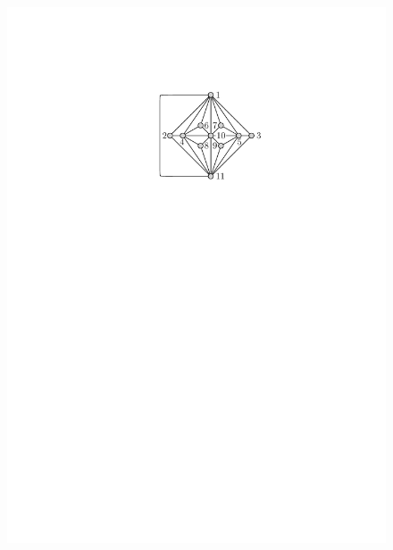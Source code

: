 \documentclass[runningheads]{llncs}
\begin{document}
\begin{figure}[t]
	{\includegraphics[scale=0.86,page=5]{graphs}}
	\hfil

\end{figure}
\end{document}
